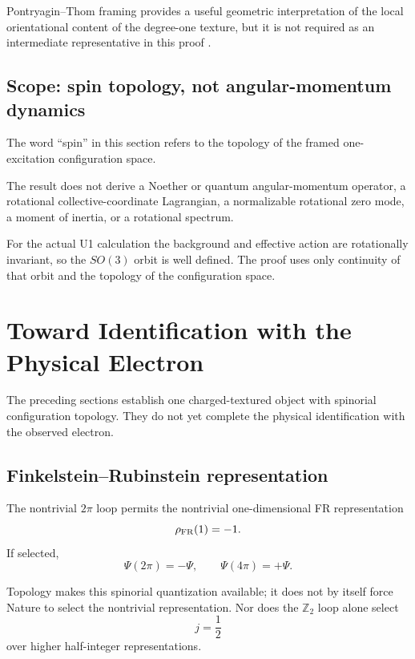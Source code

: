 \documentclass[11pt]{article}
\begin{document}
Pontryagin--Thom framing provides a useful geometric interpretation of the local orientational content of the degree-one texture, but it is not required as an intermediate representative in this proof \cite{Sorkin1988,AucklySpeight2006}.

\subsection{Scope: spin topology, not angular-momentum dynamics}

The word ``spin'' in this section refers to the topology of the framed one-excitation configuration space.

The result does not derive a Noether or quantum angular-momentum operator, a rotational collective-coordinate Lagrangian, a normalizable rotational zero mode, a moment of inertia, or a rotational spectrum.

For the actual U1 calculation the background and effective action are rotationally invariant, so the \(SO(3)\) orbit is well defined. The proof uses only continuity of that orbit and the topology of the configuration space.

\section{Toward Identification with the Physical Electron}

The preceding sections establish one charged-textured object with spinorial configuration topology. They do not yet complete the physical identification with the observed electron.

\subsection{Finkelstein--Rubinstein representation}

The nontrivial \(2\pi\) loop permits the nontrivial one-dimensional FR representation
\begin{equation}
\rho_{\rm FR}(1)=-1.
\end{equation}
If selected,
\begin{equation}
\Psi(2\pi)=-\Psi,
\qquad
\Psi(4\pi)=+\Psi.
\end{equation}

Topology makes this spinorial quantization available; it does not by itself force Nature to select the nontrivial representation. Nor does the \(\mathbb Z_2\) loop alone select
\begin{equation}
j=\frac12
\end{equation}
over higher half-integer representations.
\end{document}
